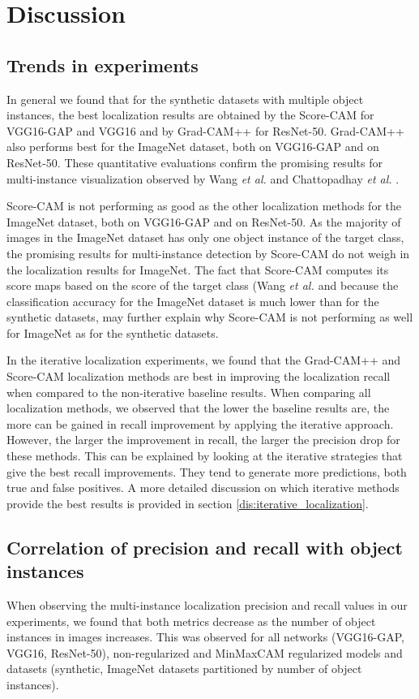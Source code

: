 \chapter{Discussion} \label{ch:discussion}

\section{Trends in experiments} \label{dis:trends_in_experiments}
In general we found that for the synthetic datasets with multiple object instances, the best localization results are obtained by the Score-CAM for VGG16-GAP and VGG16 and by Grad-CAM++ for ResNet-50. Grad-CAM++ also performs best for the ImageNet dataset, both on VGG16-GAP and on ResNet-50. These quantitative evaluations confirm the promising results for multi-instance visualization observed by Wang \textit{et al.} \cite{wang2020score} and Chattopadhay \textit{et al.} \cite{chattopadhay2018grad}.

Score-CAM is not performing as good as the other localization methods for the ImageNet dataset, both on VGG16-GAP and on ResNet-50. As the majority of images in the ImageNet dataset has only one object instance of the target class, the promising results for multi-instance detection by Score-CAM do not weigh in the localization results for ImageNet. The fact that Score-CAM computes its score maps based on the score of the target class (Wang \textit{et al. \cite{wang2020score}} and because the classification accuracy for the ImageNet dataset is much lower than for the synthetic datasets, may further explain why Score-CAM is not performing as well for ImageNet as for the synthetic datasets.

In the iterative localization experiments, we found that the Grad-CAM++ and Score-CAM localization methods are best in improving the localization recall when compared to the non-iterative baseline results. When comparing all localization methods, we observed that the lower the baseline results are, the more can be gained in recall improvement by applying the iterative approach. However, the larger the improvement in recall, the larger the precision drop for these methods. This can be explained by looking at the iterative strategies that give the best recall improvements. They tend to generate more predictions, both true and false positives. A more detailed discussion on which iterative methods provide the best results is provided in section \ref{dis:iterative_localization}.

\section{Correlation of precision and recall with object instances}
When observing the multi-instance localization precision and recall values in our experiments, we found that both metrics decrease as the number of object instances in images increases. This was observed for all networks (VGG16-GAP, VGG16, ResNet-50), non-regularized and MinMaxCAM regularized models and datasets (synthetic, ImageNet datasets partitioned by number of object instances).

